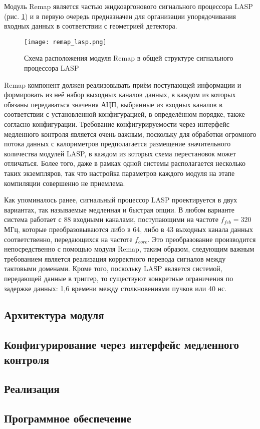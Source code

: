 Модуль Remap является частью жидкоаргонового сигнального процессора LASP (рис. \ref{fig:remap_lasp}) и в первую очередь предназначен для организации упорядочивания входных данных в соответствии с геометрией детектора.\par
\begin{figure}[ht]
    \centering
    \texttt{[image: remap\_lasp.png]}
    \caption{Схема расположения модуля Remap в общей структуре сигнального процессора LASP}
    \label{fig:remap_lasp}
\end{figure}\par
Remap компонент должен реализовывать приём поступающей информации и формировать из неё набор выходных каналов данных, в каждом из которых обязаны передаваться значения АЦП, выбранные из входных каналов в соответствии с установленной конфигурацией, в определённом порядке, также согласно конфигурации. Требование конфигурируемости через интерфейс медленного контроля является очень важным, поскольку для обработки огромного потока данных с калориметров предполагается размещение значительного количества модулей LASP, в каждом из которых схема перестановок может отличаться. Более того, даже в рамках одной системы располагается несколько таких экземпляров, так что настройка параметров каждого модуля на этапе компиляции совершенно не приемлема.\par
Как упоминалось ранее, сигнальный процессор LASP проектируется в двух вариантах, так называемые медленная и быстрая опции. В любом варианте система работает с 88 входными каналами, поступающими на частоте $f_{feb} = 320$ МГц, которые преобразовываются либо в 64, либо в 43 выходных канала данных соответственно, передающихся на частоте $f_{core}$. Это преобразование производится непосредственно с помощью модуля Remap, таким образом, следующим важным требованием является реализация корректного перевода сигналов между тактовыми доменами. Кроме того, поскольку LASP является системой, передающей данные в триггер, то существуют конкретные ограничения по задержке данных: 1,6 времени между столкновениями пучков или 40 нс.\par

\subsection{Архитектура модуля}


\subsection{Конфигурирование через интерфейс медленного контроля}


\subsection{Реализация}


\subsection{Программное обеспечение}
